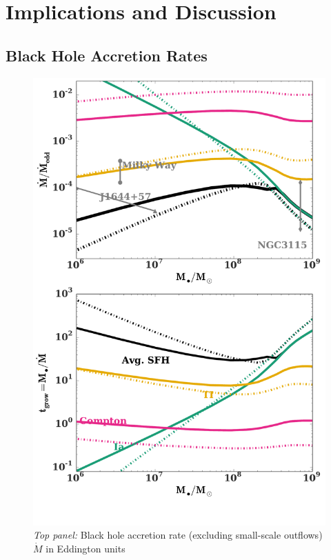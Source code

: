 \documentclass[usenatbib,fleqn]{mn2e}
\begin{document}
\section{Implications and Discussion}
\label{sec:discussion}

\subsection{Black Hole Accretion Rates}
\label{sec:mdot}



\begin{figure}
\includegraphics[width=\columnwidth]{mdot_sfr.pdf}
\caption{\label{fig:bh_growth} {\it Top panel:} Black hole accretion
  rate (excluding small-scale outflows) $\dot{M}$ in Eddington units
}
\end{figure}
\end{document}
